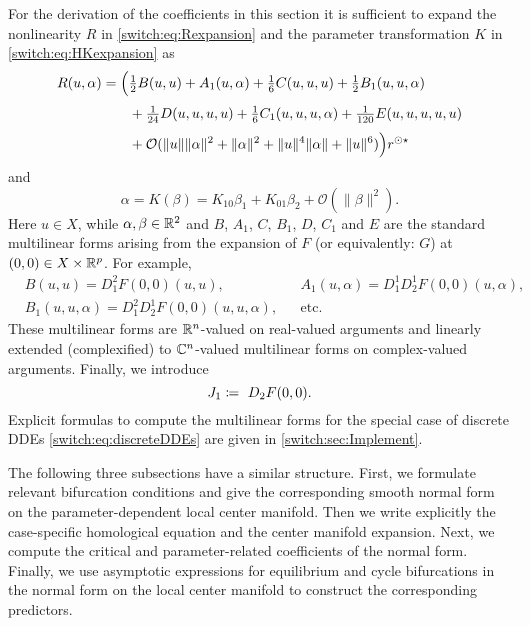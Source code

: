For the derivation of the coefficients in this section it is sufficient to expand the nonlinearity $R$ in \cref{switch:eq:Rexpansion} and the parameter transformation $K$ in \cref{switch:eq:HKexpansion} as
\begin{equation}
  \label{switch:eq:R_truncated}
  \begin{aligned}
    R(u,\alpha) ={}& \Bigl(\tfrac{1}{2} B(u,u) + A_1(u,\alpha)+\tfrac{1}{6} C(u,u,u) + \tfrac{1}{2} B_1(u,u,\alpha)\\
    &\phantom{\Bigl(}+ \tfrac{1}{24} D(u,u,u,u) + \tfrac{1}{6} C_1(u,u,u,\alpha) + \tfrac{1}{120} E(u,u,u,u,u)\\
    &\phantom{\Bigl(}+ \mathcal O(\|u\|\|\alpha\|^2+\|\alpha\|^2+\|u\|^4\|\alpha\|+\|u\|^6) \Bigr) r^{\odot\star}
  \end{aligned}
\end{equation}
and
\begin{equation}
  \label{switch:eq:K_truncated}
  \alpha = K(\beta)=K_{10} \beta_1  + K_{01} \beta_2 + \mathcal O(\|\beta\|^2).
\end{equation}
Here $u \in X$, while $\alpha,\beta \in \mathbb{R}^2$ and $B$, $A_1$, $C$, $B_1$, $D$, $C_1$ and $E$ are the standard multilinear forms arising from the expansion of $F$ (or equivalently: $G$) at $(0,0) \in X \times \mathbb{R}^p$. For example,
\begin{align*}
  &B(u,u) = D^2_1F(0,0)(u,u), &&A_1(u,\alpha) = D_1^1D^1_2F(0,0)(u,\alpha),\\
  &B_1(u,u,\alpha) = D^2_1D^1_2F(0,0)(u,u,\alpha), &&\text{etc.}
\end{align*}
These multilinear forms are $ \mathbb{R}^n$-valued on real-valued arguments and linearly extended (complexified) to $ \mathbb{C}^n$-valued multilinear forms on complex-valued arguments. Finally, we introduce
\begin{equation}
\label{switch:eq:J_1} 
J_1 \coloneqq \ D_2F(0,0). 
\end{equation}
Explicit formulas to compute the multilinear forms for the special case of discrete DDEs \cref{switch:eq:discreteDDEs} are given in \cref{switch:sec:Implement}.

The following three subsections have a similar structure. First, we formulate relevant bifurcation conditions and give the corresponding smooth normal form on the parameter-dependent local center manifold. Then we write explicitly the case-specific homological equation and the center manifold expansion. Next, we compute the critical and parameter-related coefficients of the normal form. Finally, we use asymptotic expressions for equilibrium and cycle bifurcations in the normal form on the local center manifold to construct the corresponding predictors.

